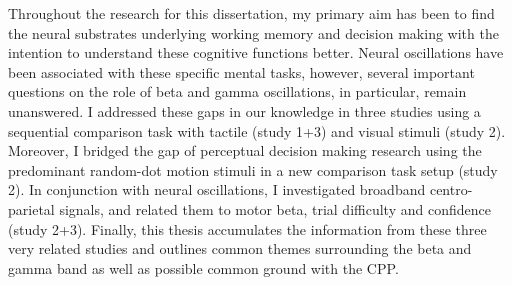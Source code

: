 Throughout the research for this dissertation, my primary aim has been to find the neural substrates underlying working memory and decision making with the intention to understand these cognitive functions better. Neural oscillations have been associated with these specific mental tasks, however, several important questions on the role of beta and gamma oscillations, in particular, remain unanswered. I addressed these gaps in our knowledge in three studies using a sequential comparison task with tactile (study 1+3) and visual stimuli (study 2). Moreover, I bridged the gap of perceptual decision making research using the predominant random-dot motion stimuli in a new comparison task setup (study 2). In conjunction with neural oscillations, I investigated broadband centro-parietal signals, and related them to motor beta, trial difficulty and confidence (study 2+3). Finally, this thesis accumulates the information from these three very related studies and outlines common themes surrounding the beta and gamma band as well as possible common ground with the CPP. 